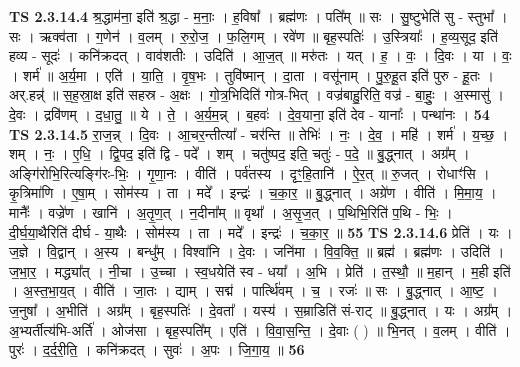 \documentclass[17pt]{extarticle}
\begin{document}
                  \newline
                                \textbf{ TS 2.3.14.4} \newline
                  श्र॒द्धाम॑ना॒ इति॑ श्र॒द्धा - म॒नाः॒ । ह॒विषा᳚ । ब्रह्म॑णः । पति᳚म् ॥ सः । सु॒ष्टुभेति॑ सु - स्तुभा᳚ । सः । ऋक्व॑ता । ग॒णेन॑ । व॒लम् । रु॒रो॒ज॒ । फ॒लि॒गम् । रवे॑ण ॥ बृह॒स्पतिः॑ । उ॒स्त्रियाः᳚ । ह॒व्य॒सूद॒ इति॑ हव्य - सूदः॑ । कनि॑क्रदत् । वाव॑शतीः । उदिति॑ । आ॒ज॒त् ॥ मरु॑तः । यत् । ह॒ । वः॒ । दि॒वः । या । वः॒ । शर्म॑ ॥ अ॒र्य॒मा । एति॑ । या॒ति॒ । वृ॒ष॒भः । तुवि॑ष्मान् । दा॒ता । वसू॑नाम् । पु॒रु॒हू॒त इति॑ पुरु - हू॒तः । अर्.हन्न्॑ ॥ स॒ह॒स्रा॒क्ष इति॑ सहस्र - अ॒क्षः । गो॒त्र॒भिदिति॑ गोत्र-भित् । वज्र॑बाहु॒रिति॒ वज्र॑ - बा॒हुः॒ । अ॒स्मासु॑ । दे॒वः । द्रवि॑णम् । द॒धा॒तु॒ ॥ ये । ते॒ । अ॒र्य॒म॒न्न् । ब॒हवः॑ । दे॒व॒याना॒ इति॑ देव - यानाः᳚ । पन्था॑नः । \textbf{  54} \newline
                  \newline
                                \textbf{ TS 2.3.14.5} \newline
                  रा॒ज॒न्न् । दि॒वः । आ॒चर॒न्तीत्या᳚ - चर॑न्ति ॥ तेभिः॑ । नः॒ । दे॒व॒ । महि॑ । शर्म॑ । य॒च्छ॒ । शम् । नः॒ । ए॒धि॒ । द्वि॒पद॒ इति॑ द्वि - पदे᳚ । शम् । चतु॑ष्पद॒ इति॒ चतुः॑ - प॒दे॒ ॥ बु॒द्ध्नात् । अग्र᳚म् । अङ्गि॑रोभि॒रित्यङ्गि॑रः-भिः॒ । गृ॒णा॒नः । वीति॑ । पर्व॑तस्य । दृꣳ॒॒हि॒तानि॑ । ऐ॒र॒त् ॥ रु॒जत् । रोधाꣳ॑सि । कृ॒त्रिमा॑णि । ए॒षा॒म् । सोम॑स्य । ता । मदे᳚ । इन्द्रः॑ । च॒का॒र॒ ॥ बु॒द्ध्नात् । अग्रे॑ण । वीति॑ । मि॒मा॒य॒ । मानैः᳚ । वज्रे॑ण । खानि॑ । अ॒तृ॒ण॒त् । न॒दीना᳚म् ॥ वृथा᳚ । अ॒सृ॒ज॒त् । प॒थिभि॒रिति॑ प॒थि - भिः॒ । दी॒र्घ॒या॒थैरिति॑ दीर्घ - या॒थैः । सोम॑स्य । ता । मदे᳚ । इन्द्रः॑ । च॒का॒र॒ ॥ \textbf{  55} \newline
                  \newline
                                \textbf{ TS 2.3.14.6} \newline
                  प्रेति॑ । यः । ज॒ज्ञे । वि॒द्वान् । अ॒स्य । बन्धु᳚म् । विश्वा॑नि । दे॒वः । जनि॑मा । वि॒व॒क्ति॒ ॥ ब्रह्म॑ । ब्रह्म॑णः । उदिति॑ । ज॒भा॒र॒ । मद्ध्या᳚त् । नी॒चा । उ॒च्चा । स्व॒धयेति॑ स्व - धया᳚ । अ॒भि । प्रेति॑ । त॒स्थौ॒ ॥ म॒हान् । म॒ही इति॑ । अ॒स्त॒भा॒य॒त् । वीति॑ । जा॒तः । द्याम् । सद्म॑ । पार्त्थि॑वम् । च॒ । रजः॑ ॥ सः । बु॒द्ध्नात् । आ॒ष्ट॒ । ज॒नुषा᳚ । अ॒भीति॑ । अग्र᳚म् । बृह॒स्पतिः॑ । दे॒वता᳚ । यस्य॑ । स॒म्राडिति॑ सं-राट् ॥ बु॒द्ध्नात् । यः । अग्र᳚म् । अ॒भ्यर्तीत्य॑भि-अर्ति॑ । ओज॑सा । बृह॒स्पति᳚म् । एति॑ । वि॒वा॒स॒न्ति॒ । दे॒वाः ( ) ॥ भि॒नत् । व॒लम् । वीति॑ । पुरः॑ । द॒र्द॒री॒ति॒ । कनि॑क्रदत् । सुवः॑ । अ॒पः । जि॒गा॒य॒ ॥ \textbf{  56} \newline
\end{document}

